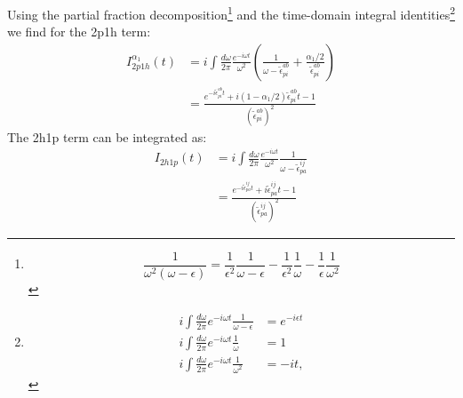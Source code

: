 Using the partial fraction decomposition\footnote{
\begin{equation}
    \frac{1}{\omega^2(\omega - \epsilon)} = \frac{1}{\epsilon^2} \frac{1}{\omega - \epsilon} - \frac{1}{\epsilon^2} \frac{1}{\omega} - \frac{1}{\epsilon} \frac{1}{\omega^2}
\end{equation}}
and the time-domain integral identities\footnote{
\begin{align}
    i \int \frac{d\omega}{2\pi} e^{-i\omega t} \frac{1}{\omega - \epsilon} &= e^{-i\epsilon t} \\
    i \int \frac{d\omega}{2\pi} e^{-i\omega t} \frac{1}{\omega} &= 1 \\
    i \int \frac{d\omega}{2\pi} e^{-i\omega t} \frac{1}{\omega^2} &= -it,
\end{align}}
we find for the 2p1h term:
\begin{align}
    I_{2p1h}^{\alpha_1}(t) &= i \int \frac{d\omega}{2\pi} \frac{e^{-i\omega t}}{\omega^2} \left( \frac{1}{\omega - \tilde{\epsilon}_{pi}^{ab}} + \frac{\alpha_1/2}{\tilde{\epsilon}_{pi}^{ab}} \right) \\
&= \frac{e^{-i\tilde{\epsilon}_{pi}^{ab} t} + i \left( 1-\alpha_1/2 \right) \tilde{\epsilon}_{pi}^{ab} t - 1}{(\tilde{\epsilon}_{pi}^{ab})^2}
\end{align}
The 2h1p term can be integrated as:
\begin{align}
    I_{2h1p}(t) &= i \int \frac{d\omega}{2\pi} \frac{e^{-i\omega t}}{\omega^2} \frac{1}{\omega - \tilde{\epsilon}_{pa}^{ij}} \\
&= \frac{e^{-i\tilde{\epsilon}_{pa}^{ij} t} + i \tilde{\epsilon}_{pa}^{ij} t - 1}{(\tilde{\epsilon}_{pa}^{ij})^2}
\end{align}
